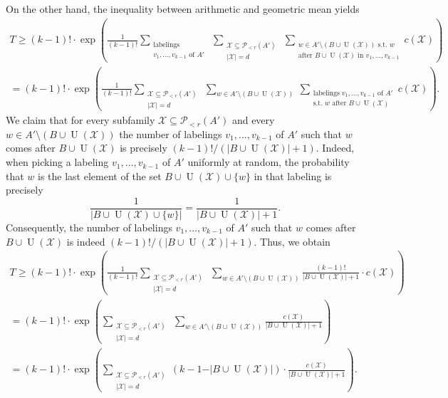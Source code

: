 \documentclass[11pt]{article}
\theoremstyle{definition}
\numberwithin{equation}{section}
\begin{document}
On the other hand, the inequality between arithmetic and geometric mean yields
\begin{multline*}
T\geq (k-1)!\cdot \exp\left(\frac{1}{(k-1)!}\sum_{\substack{\text{labelings }\\v_1,\dots, v_{k-1}\text{ of } A'}}\ \sum_{\substack{\mathcal{X}\subseteq \mathcal{P}\!_{<r}(A')\\\vert \mathcal{X}\vert=d}}\ \sum_{\substack{w\in A'\setminus(B\cup \operatorname{U}(\mathcal{X}))\text{ s.t. }w\\\text{after }B\cup \operatorname{U}(\mathcal{X})\text{ in }v_1,\dots,v_{k-1}}}c(\mathcal{X})\right)\\
=(k-1)!\cdot \exp\left(\frac{1}{(k-1)!}\sum_{\substack{\mathcal{X}\subseteq \mathcal{P}\!_{<r}(A')\\\vert \mathcal{X}\vert=d}}\ \sum_{w\in A'\setminus(B\cup \operatorname{U}(\mathcal{X}))}\ \sum_{\substack{\text{labelings }v_1,\dots, v_{k-1}\text{ of } A'\\\text{s.t. }w\text{ after }B\cup \operatorname{U}(\mathcal{X})}}c(\mathcal{X})\right).
\end{multline*}
We claim that for every subfamily $\mathcal{X}\subseteq \mathcal{P}\!_{<r}(A')$ and every $w\in A'\setminus(B\cup  \operatorname{U}(\mathcal{X}))$ the number of labelings $v_1,\dots,v_{k-1}$ of $A'$ such that $w$ comes after $B\cup  \operatorname{U}(\mathcal{X})$ is precisely $(k-1)!/(\vert B\cup  \operatorname{U}(\mathcal{X})\vert+1)$. Indeed, when picking a labeling $v_1,\dots,v_{k-1}$ of $A'$ uniformly at random, the probability that $w$ is the last element of the set $B\cup  \operatorname{U}(\mathcal{X})\cup \lbrace w\rbrace$ in that labeling is precisely
\[\frac{1}{\vert B\cup  \operatorname{U}(\mathcal{X})\cup \lbrace w\rbrace\vert}=\frac{1}{\vert B\cup  \operatorname{U}(\mathcal{X})\vert+1}.\]
Consequently, the number of labelings $v_1,\dots,v_{k-1}$ of $A'$ such that $w$ comes after $B\cup  \operatorname{U}(\mathcal{X})$ is indeed $(k-1)!/(\vert B\cup  \operatorname{U}(\mathcal{X})\vert+1)$. Thus, we obtain
\begin{multline*}
T \geq (k-1)!\cdot \exp\left(\frac{1}{(k-1)!}\sum_{\substack{\mathcal{X}\subseteq \mathcal{P}\!_{<r}(A')\\\vert \mathcal{X}\vert=d}}\ \sum_{w\in A'\setminus(B\cup \operatorname{U}(\mathcal{X}))}\frac{(k-1)!}{\vert B\cup  \operatorname{U}(\mathcal{X})\vert+1}\cdot c(\mathcal{X})\right)\\
=(k-1)!\cdot \exp\left(\sum_{\substack{\mathcal{X}\subseteq \mathcal{P}\!_{<r}(A')\\\vert \mathcal{X}\vert=d}}\ \sum_{w\in A'\setminus(B\cup \operatorname{U}(\mathcal{X}))}\frac{c(\mathcal{X})}{\vert B\cup \operatorname{U}(\mathcal{X})\vert+1}\right)\\
=(k-1)!\cdot \exp\left(\sum_{\substack{\mathcal{X}\subseteq \mathcal{P}\!_{<r}(A')\\\vert \mathcal{X}\vert=d}}(k-1-\vert B\cup \operatorname{U}(\mathcal{X})\vert)\cdot \frac{c(\mathcal{X})}{\vert B\cup \operatorname{U}(\mathcal{X})\vert+1}\right).
\end{multline*}
\end{document}
